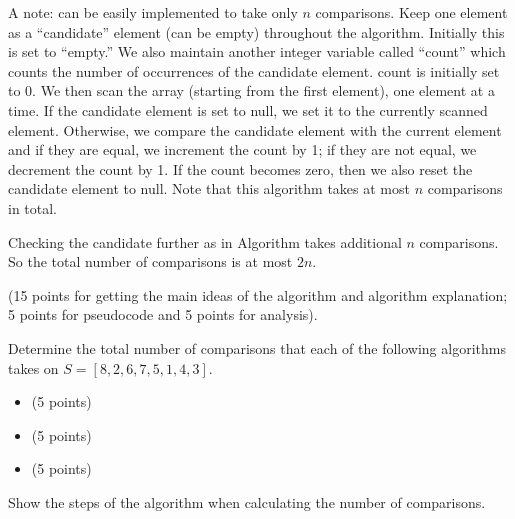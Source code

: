 \documentclass{article}
\begin{document}
\begin{solution}
    A note:  can  be easily implemented to take only $n$ comparisons. Keep
    one element as a ``candidate'' element  (can be empty) throughout the algorithm. Initially this is set  to ``empty.''
    We also maintain another integer variable called ``count'' which counts the number of occurrences
    of the candidate element.  count is initially set to 0. We then scan the  array (starting from the first element), one
    element at a time. If the candidate element is set to null, we set it to the currently scanned element.
    Otherwise, we compare the candidate element with the current element and if they are equal, we increment
    the count by 1; if they are not equal, we decrement the count by 1. If the count becomes zero, then
    we also reset the candidate element to null.  Note that this algorithm takes at most $n$ comparisons in total.

    Checking the candidate further as in  Algorithm  takes additional $n$ comparisons.
    So the total number of comparisons is at most $2n$.

    (15 points for getting the main ideas of the algorithm and algorithm explanation; 5 points for pseudocode
    and 5 points for analysis).


\end{solution}

\begin{exercise}{5.1}
    Determine the total number of comparisons that each of the following algorithms takes on $S = [8, 2, 6, 7, 5, 1, 4, 3]$.
    \begin{itemize}[nosep]
        \item {} (5 points)
        \item {} (5 points)
        \item {}  (5 points)
    \end{itemize}
    Show the steps of the algorithm when calculating the number of comparisons.
\end{exercise}
\end{document}
